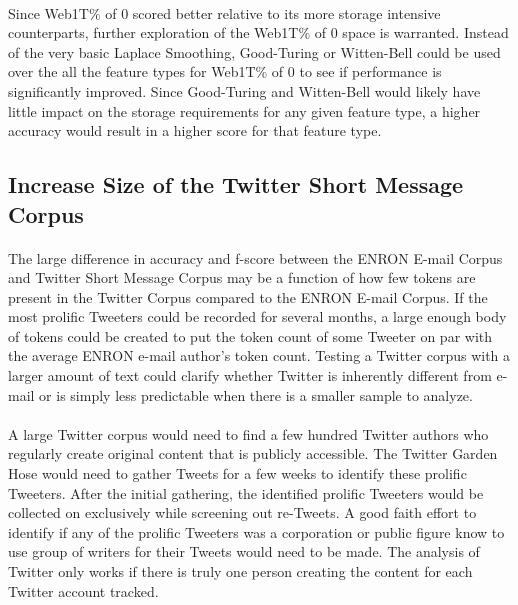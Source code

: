 	\paragraph*{} Since Web1T\% of 0 scored better relative to its more storage intensive counterparts, further exploration of the Web1T\% of 0 space is warranted.  Instead of the very basic Laplace Smoothing, Good-Turing or Witten-Bell could be used over the all the feature types for Web1T\% of 0 to see if performance is significantly improved.  Since Good-Turing and Witten-Bell would likely have little impact on the storage requirements for any given feature type, a higher accuracy would result in a higher score for that feature type.

\subsection{Increase Size of the Twitter Short Message Corpus}
	\paragraph*{} The large difference in accuracy and f-score between the ENRON E-mail Corpus and Twitter Short Message Corpus may be a function of how few tokens are present in the Twitter Corpus compared to the ENRON E-mail Corpus.  If the most prolific Tweeters could be recorded for several months, a large enough body of tokens could be created to put the token count of some Tweeter on par with the average ENRON e-mail author's token count.  Testing a Twitter corpus with a larger amount of text could clarify whether Twitter is inherently different from e-mail or is simply less predictable when there is a smaller sample to analyze.
	\paragraph*{} A large Twitter corpus would need to find a few hundred Twitter authors who regularly create original content that is publicly accessible.  The Twitter Garden Hose would need to gather Tweets for a few weeks to identify these prolific Tweeters.  After the initial gathering, the identified prolific Tweeters would be collected on exclusively while screening out re-Tweets.  A good faith effort to identify if any of the prolific Tweeters was a corporation or public figure know to use group of writers for their Tweets would need to be made.  The analysis of Twitter only works if there is truly one person creating the content for each Twitter account tracked.
